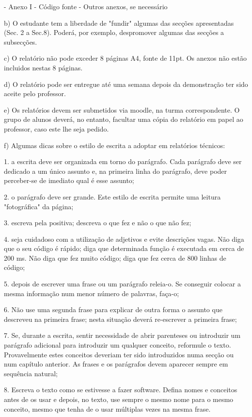 \documentclass[article, a4paper, 11pt, oneside]{memoir}
\begin{document}
- Anexo I - Código fonte
- Outros anexos, se necessário


b) O estudante tem a liberdade de "fundir" algumas das secções apresentadas (Sec. 2 a Sec.8). Poderá, por exemplo, despromover algumas das secções a subsecções.


c) O relatório não pode exceder 8 páginas A4, fonte de 11pt. Os anexos não estão incluidos nestas 8 páginas.


d) O relatório pode ser entregue até uma semana depois da demonstração ter sido aceite pelo professor.


e) Os relatórios devem ser submetidos via moodle, na turma correspondente. O grupo de alunos deverá, no entanto, facultar uma cópia do relatório em papel ao professor, caso este lhe seja pedido.


f) Algumas dicas sobre o estilo de escrita a adoptar em relatórios técnicos:


1. a escrita deve ser organizada em torno do parágrafo.
  Cada parágrafo deve ser dedicado a um único assunto e,
  na primeira linha do parágrafo, deve poder perceber-se
  de imediato qual é esse assunto;

2. o parágrafo deve ser grande. Este estilo de escrita permite
  uma leitura "fotográfica" da página;

3. escreva pela positiva; descreva o que fez e não o que não fez;

4. seja cuidadoso com a utilização de adjetivos e evite
  descrições vagas.  Não diga que  o seu código é rápido; diga
  que determinada função é executada em cerca de 200 ms. Não diga
  que fez muito código; diga que fez cerca de 800 linhas de código;

5. depois de escrever uma frase ou um parágrafo releia-o. Se
  conseguir colocar a mesma informação num menor número de
  palavras, faça-o;

6. Não use uma segunda frase para explicar de outra forma o assunto
  que descreveu na primeira frase; nesta situação deverá re-escrever
  a primeira frase;

7. Se, durante a escrita, sentir necessidade de abrir parenteses ou
  introduzir um parágrafo adicional para introduzir um qualquer
  conceito, reformule o texto. Provavelmente estes conceitos deveriam
  ter sido introduzidos numa secção ou num capítulo anterior. As frases e
  os parágrafos devem aparecer sempre em sequência natural;

8. Escreva o texto como se estivesse a fazer software. Defina nomes
    e conceitos antes de os usar e depois, no texto, use sempre o mesmo nome
  para o mesmo conceito, mesmo que tenha de o usar múltiplas vezes na
  mesma frase.
  
\end{document}

